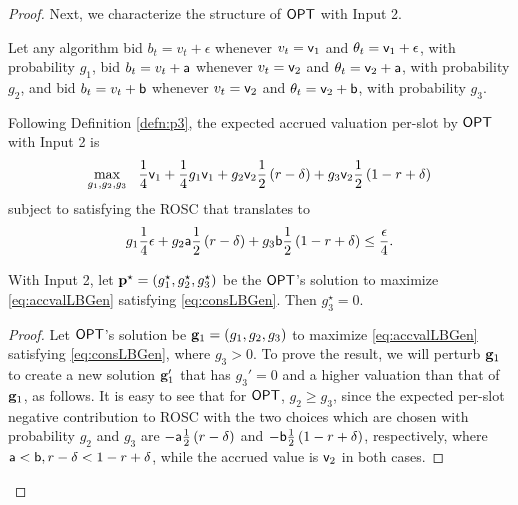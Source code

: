 \begin{proof}
Next, we characterize the structure of $\mathsf{OPT}$ with Input 2.
\begin{definition}\label{defn:p3}
Let any algorithm bid $b_t=v_t+\epsilon$ whenever $v_t={\mathsf{v}}_1$ and $\theta_t={\mathsf{v}}_1+\epsilon$, with probability $g_1$,  
bid $b_t=v_t+{\mathsf{a}}$ whenever $v_t={\mathsf{v}}_2$ and $\theta_t={\mathsf{v}}_2+{\mathsf{a}}$, with probability $g_2$, and bid $b_t=v_t+{\mathsf{b}}$ whenever $v_t={\mathsf{v}}_2$ and $\theta_t={\mathsf{v}}_2+{\mathsf{b}}$, with probability $g_3$.
\end{definition}
Following Definition \ref{defn:p3}, the expected accrued valuation per-slot by $\mathsf{OPT}$ with Input 2 is
\begin{equation}\label{eq:accvalLBGen}
\max_{g_1, g_2, g_3} \ \ \frac{1}{4}{\mathsf{v}}_1 + \frac{1}{4}g_1 {\mathsf{v}}_1 + g_2 {\mathsf{v}}_2 \frac{1}{2} \left(r-\delta\right) + g_3 {\mathsf{v}}_2 \frac{1}{2} \left(1-r+\delta\right)
\end{equation}
subject to satisfying the ROSC that translates to
\begin{equation}\label{eq:consLBGen}
g_1 \frac{1}{4} \epsilon + g_2 {\mathsf{a}} \frac{1}{2} \left(r-\delta\right)  + g_3 {\mathsf{b}} \frac{1}{2} \left(1-r+\delta\right) \le \frac{\epsilon}{4}.
\end{equation}
\begin{lemma}\label{lem:accvalLBGen} With Input 2, let ${\mathbf{p}}^\star = (g_1^\star, g_2^\star, g_3^\star)$ be the $\mathsf{OPT}$'s solution to maximize \eqref{eq:accvalLBGen} satisfying \eqref{eq:consLBGen}. Then $g_3^\star=0$.
\end{lemma}
\begin{proof}
Let $\mathsf{OPT}$'s solution be ${\mathbf{g}}_1 = (g_1, g_2, g_3)$ to maximize \eqref{eq:accvalLBGen} satisfying \eqref{eq:consLBGen}, where $g_3>0$.  To prove the result, we will perturb 
${\mathbf{g}}_1$ to create a new solution ${\mathbf{g}}_1'$ that has $g_3'=0$ and a higher valuation than that of ${\mathbf{g}}_1$, as follows.
It is easy to see that for $\mathsf{OPT}$, $g_2\ge g_3$, since the expected per-slot negative contribution to ROSC with the two choices which are chosen with probability $g_2$ and $g_3$ are $-{\mathsf{a}} \frac{1}{2} \left(r-\delta\right)$ and $-{\mathsf{b}} \frac{1}{2} \left(1-r+\delta\right)$, respectively, where ${\mathsf{a}}<{\mathsf{b}}, r-\delta <1-r+\delta$, while the accrued value is ${\mathsf{v}}_2$ in both cases. 

\end{proof}
\end{proof}
